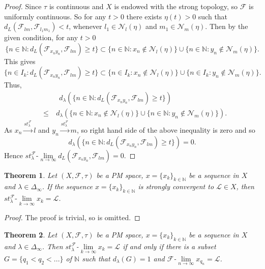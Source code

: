 \documentclass[reqno,b5paper]{amsart}
\theoremstyle{plain}
\newtheorem{thm}{Theorem}[section]
\theoremstyle{definition}
\begin{document}
\begin{proof}
Since $\tau$ is continuous and $X$ is endowed with the strong
topology, so $\mathcal{F}$ is uniformly continuous. So for any
$t>0$ there exists $\eta(t)>0$ such that
$d_L(\mathcal{F}_{lm},\mathcal{F}_{l_1m_1})<t$, whenever
$l_1\in\mathcal{N}_l(\eta)$ and $m_1\in\mathcal{N}_m(\eta)$. Then
by the given condition, for any $t > 0$
$$\{n\in\mathbb{N} :d_L(\mathcal{F}_{x_ny_n}, \mathcal{F}_{lm})\geq t\}\subset\{n\in \mathbb{N}:x_n\notin\mathcal{N}_l(\eta)\}\cup\{n\in\mathbb{N}:y_n\notin\mathcal{N}_m(\eta)\}.$$ This gives
$$\{n\in I_k:d_L(\mathcal{F}_{x_ny_n}, \mathcal{F}_{lm})\geq t\}\subset\{n\in I_k:x_n\notin \mathcal{N}_l(\eta)\}\cup\{n\in I_k:y_n\notin \mathcal{N}_m(\eta)\}.$$ Thus,
\begin{eqnarray*}
&&~~~d_{\lambda}(\{n\in
\mathbb{N}: d_L(\mathcal{F}_{x_ny_n}, \mathcal{F}_{lm})\geq t\})\\
&\leq&~ d_{\lambda}(\{n\in \mathbb{N}: x_n\notin
\mathcal{N}_l(\eta)\}\cup\{n\in \mathbb{N}: y_n\notin
\mathcal{N}_m(\eta)\}).
\end{eqnarray*}
As $ x_n\xrightarrow{st^\mathcal{F}_{\lambda}}l$ and
$y_n\xrightarrow{st^\mathcal{F}_{\lambda}}m$, so right hand side
of the above inequality is zero and so $$d_{\lambda}(\{n\in
\mathbb{N}: d_L(\mathcal{F}_{x_ny_n}, \mathcal{F}_{lm})\geq
t\})=0.$$ Hence
$st^\mathcal{F}_\lambda\mbox{-}\lim\limits_{n\rightarrow\infty}d_L(\mathcal{F}_{x_ny_n},
\mathcal{F}_{lm})=0$.
\end{proof}
\begin{thm}
Let $(X,\mathcal{F},\tau)$ be a PM space, $x=\{x_k\}_{k
\in\mathbb{N}}$ be a sequence in $X$ and
$\lambda\in\Delta_\infty$. If the sequence $x=\{x_k\}_{k \in
\mathbb{N}}$ is strongly convergent to $\mathcal{L}\in X$, then
$st^\mathcal{F}_\lambda\mbox{-}\lim\limits_{k\rightarrow\infty}x_k=\mathcal{L}$.
\end{thm}
\begin{proof}
The proof is trivial, so is omitted.
\end{proof}
\begin{thm}
Let $(X,\mathcal{F},\tau)$ be a PM space,
$x=\{x_k\}_{k\in\mathbb{N}}$ be a sequence in $X$ and
$\lambda\in\Delta_{\infty}$. Then
$st_\lambda^\mathcal{F}$-$\lim\limits_{k\rightarrow\infty}x_k=\mathcal{L}$
if and only if there is a subset $G=\{q_1<q_2<...\}$ of
$\mathbb{N}$ such that $d_\lambda(G)=1$ and
$\mathcal{F}$-$\lim\limits_{n\rightarrow\infty}x_{q_n}=\mathcal{L}$.
\end{thm}
\end{document}
